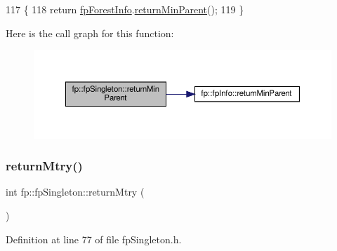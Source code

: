 \begin{DoxyCode}
117                                         \{
118                 \textcolor{keywordflow}{return} \hyperlink{classfp_1_1fpSingleton_a85965009befa72a749ae498fa5b6ccfa}{fpForestInfo}.\hyperlink{classfp_1_1fpInfo_ad1af845e85cb6e807694c5106baca230}{returnMinParent}();
119             \}
\end{DoxyCode}
Here is the call graph for this function\+:\nopagebreak
\begin{figure}[H]
\begin{center}
\leavevmode
\includegraphics[width=350pt]{classfp_1_1fpSingleton_a2d06406b6462099e0adb393218090420_cgraph}
\end{center}
\end{figure}
\mbox{\label{classfp_1_1fpSingleton_a45ae68ceb91880ddbc0e049a47c371eb}} 
\subsubsection{\texorpdfstring{return\+Mtry()}{returnMtry()}}
{\footnotesize\ttfamily int fp\+::fp\+Singleton\+::return\+Mtry (\begin{DoxyParamCaption}{ }\end{DoxyParamCaption})\hspace{0.3cm}{\ttfamily [inline]}}



Definition at line 77 of file fp\+Singleton.\+h.


